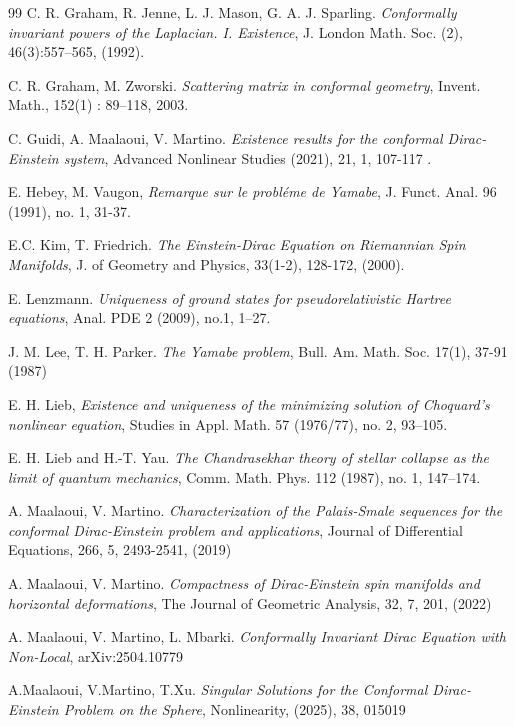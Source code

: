\documentclass[11pt]{article}
\begin{document}
{\begin{thebibliography}{99}
 C. R. Graham, R. Jenne, L. J. Mason, G. A. J. Sparling. \emph{Conformally invariant powers of the Laplacian. I. Existence}, J. London Math. Soc. (2), 46(3):557–565, (1992).

 C. R. Graham, M. Zworski. \emph{Scattering matrix in conformal geometry}, Invent. Math., 152(1) : 89–118, 2003. 

 C. Guidi, A. Maalaoui, V. Martino. \emph{ Existence results for the conformal Dirac-Einstein system}, Advanced Nonlinear Studies (2021), 21, 1, 107-117 .

 E. Hebey, M. Vaugon,\emph{ Remarque sur le probl\'{e}me de Yamabe},  J. Funct. Anal. 96 (1991), no. 1, 31-37.
    
 E.C. Kim, T. Friedrich. \emph{The Einstein-Dirac Equation on Riemannian Spin Manifolds}, J. of Geometry and Physics, 33(1-2), 128-172, (2000).

 E. Lenzmann. \emph{Uniqueness of ground states for pseudorelativistic Hartree equations}, Anal. PDE 2 (2009), no.1, 1–27.

 J. M. Lee, T. H. Parker. \emph{The Yamabe problem}, Bull. Am. Math. Soc. 17(1), 37-91 (1987) 

 E. H. Lieb, \emph{Existence and uniqueness of the minimizing solution of Choquard’s nonlinear equation}, Studies in Appl. Math. 57 (1976/77), no. 2, 93–105.

 E. H. Lieb and H.-T. Yau. \emph{The Chandrasekhar theory of stellar collapse as the limit of quantum mechanics}, Comm. Math. Phys. 112 (1987), no. 1, 147–174.

 A. Maalaoui, V. Martino. \emph{ Characterization of the Palais-Smale sequences for the conformal Dirac-Einstein problem and applications}, Journal of Differential Equations, 266, 5, 2493-2541, (2019)

 A. Maalaoui, V. Martino. \emph{ Compactness of Dirac-Einstein spin manifolds and horizontal deformations}, The Journal of Geometric Analysis, 32, 7, 201, (2022)

 A. Maalaoui, V. Martino, L. Mbarki. \emph{Conformally Invariant Dirac Equation with Non-Local}, arXiv:2504.10779 

 A.Maalaoui, V.Martino, T.Xu. \emph{Singular Solutions for the Conformal Dirac-Einstein Problem on the Sphere}, Nonlinearity, (2025), 38, 015019


\end{thebibliography}}
\end{document}
